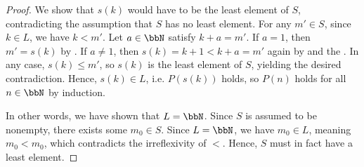 \begin{proof}
We show that $s(k)$ would have to be the least element of $S$, contradicting the assumption that $S$ has no least element. For any $m' \in S$, since $k \in L$, we have $k < m'$. Let $a \in \bbN$ satisfy $k+a = m'$. If $a = 1$, then $m' = s(k)$ by . If $a \neq 1$, then $s(k) = k+1 < k+a = m'$ again by  and the . In any case, $s(k) \leq m'$, so $s(k)$ is the least element of $S$, yielding the desired contradiction. Hence, $s(k) \in L$, i.e. $P(s(k))$ holds, so $P(n)$ holds for all $n \in \bbN$ by induction. 

In other words, we have shown that $L = \bbN$. Since $S$ is assumed to be nonempty, there exists some $m_0 \in S$. Since $L = \bbN$, we have $m_0 \in L$, meaning $m_0 < m_0$, which contradicts the irreflexivity of $<$. Hence, $S$ must in fact have a least element.
\end{proof}
